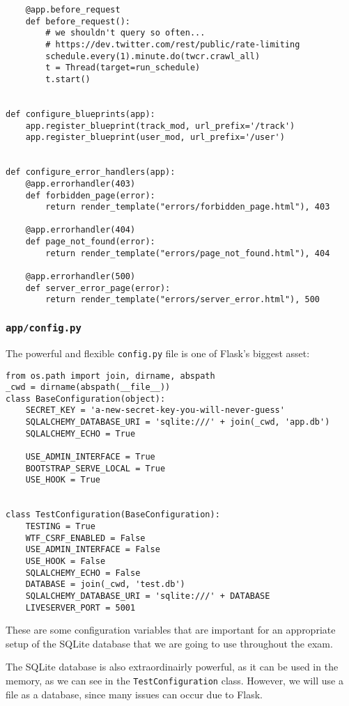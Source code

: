 \documentclass[../main/main.tex]{subfiles}
\begin{document}
\begin{lstlisting}
    @app.before_request
    def before_request():
        # we shouldn't query so often...
        # https://dev.twitter.com/rest/public/rate-limiting
        schedule.every(1).minute.do(twcr.crawl_all)
        t = Thread(target=run_schedule)
        t.start()


def configure_blueprints(app):
    app.register_blueprint(track_mod, url_prefix='/track')
    app.register_blueprint(user_mod, url_prefix='/user')


def configure_error_handlers(app):
    @app.errorhandler(403)
    def forbidden_page(error):
        return render_template("errors/forbidden_page.html"), 403

    @app.errorhandler(404)
    def page_not_found(error):
        return render_template("errors/page_not_found.html"), 404

    @app.errorhandler(500)
    def server_error_page(error):
        return render_template("errors/server_error.html"), 500
\end{lstlisting}

\subsubsection{\lstinline|app/config.py|}
\label{sec:config.py}

The powerful and flexible \lstinline|config.py| file is one of Flask's
biggest asset:

\begin{lstlisting}[caption=app/config.py, label=lst:config.py]
from os.path import join, dirname, abspath
_cwd = dirname(abspath(__file__))
class BaseConfiguration(object):
    SECRET_KEY = 'a-new-secret-key-you-will-never-guess'
    SQLALCHEMY_DATABASE_URI = 'sqlite:///' + join(_cwd, 'app.db')
    SQLALCHEMY_ECHO = True

    USE_ADMIN_INTERFACE = True
    BOOTSTRAP_SERVE_LOCAL = True
    USE_HOOK = True


class TestConfiguration(BaseConfiguration):
    TESTING = True
    WTF_CSRF_ENABLED = False
    USE_ADMIN_INTERFACE = False
    USE_HOOK = False
    SQLALCHEMY_ECHO = False
    DATABASE = join(_cwd, 'test.db')
    SQLALCHEMY_DATABASE_URI = 'sqlite:///' + DATABASE
    LIVESERVER_PORT = 5001
\end{lstlisting}

These are some configuration variables that are important for an
appropriate setup of the SQLite database that we are going to use
throughout the exam. 

The SQLite database is also extraordinairly powerful, as it can be
used in the memory, as we can see in the \lstinline|TestConfiguration|
class. However, we will use a file as a database, since many issues can
occur due to Flask. 
\end{document}
